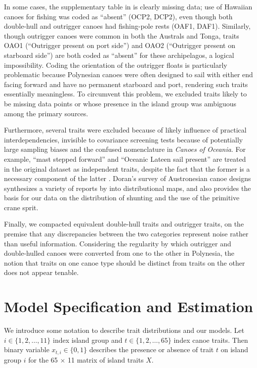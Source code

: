 \documentclass[11pt]{article}
\begin{document}
In some cases, the supplementary table in \cite{rogers2008:Canoes} is clearly missing data; use of Hawaiian canoes for fishing was coded as ``absent'' (OCP2, DCP2), even though both double-hull and outrigger canoes had fishing-pole rests (OAF1, DAF1). Similarly, though outrigger canoes were common in both the Australs and Tonga, traits OAO1 (``Outrigger present on port side'') and OAO2 (``Outrigger present on starboard side'') are both coded as ``absent'' for these archipelagos, a logical impossibility. Coding the orientation of the outrigger floats is particularly problematic because Polynesian canoes were often designed to sail with either end facing forward and have no permanent starboard and port, rendering such traits essentially meaningless. To circumvent this problem, we excluded traits likely to be missing data points or whose presence in the island group was ambiguous among the primary sources.

Furthermore, several traits were excluded because of likely influence of practical interdependencies, invisible to covariance screening tests because of potentially large sampling biases and the confused nomenclature in \textit{Canoes of Oceania}. For example, ``mast stepped forward'' and ``Oceanic Lateen sail present'' are treated in the original dataset as independent traits, despite the fact that the former is a necessary component of the latter \citep{Doran1981canoes}. Doran's survey of Austronesian canoe designs synthesizes a variety of reports by \cite{HaddonHornell1936} into distributional maps, and also provides the basis for our data on the distribution of shunting and the use of the primitive crane sprit.     

Finally, we compacted equivalent double-hull traits and outrigger traits, on the premise that any discrepancies between the two categories represent noise rather than useful information. Considering the regularity by which outrigger and double-hulled canoes were converted from one to the other in Polynesia, the notion that traits on one canoe type should be distinct from traits on the other does not appear tenable.


\section{Model Specification and Estimation}

We introduce some notation to describe trait distributions and our models. Let $i \in \{1,2, \dots ,11\}$ index island group and $t \in \{1,2,\dots,65\}$ index canoe traits. Then binary variable $x_{t,i} \in \{0,1\}$ describes the presence or absence of trait $t$ on island group $i$ for the 65 $\times$ 11 matrix of island traits $X$.
\end{document}
